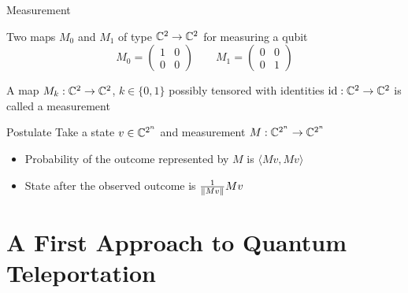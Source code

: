 \documentclass{beamer}
\begin{document}
\begin{frame}{Measurement}

        Two maps $M_0$ and $M_1$ of type $\mathbb{C}^2 \to \mathbb{C}^2$ for
        measuring a qubit
        \[
                M_0 = \begin{pmatrix}
                        1 & 0 \\
                        0 & 0 
                \end{pmatrix}
                \qquad
                M_1 = \begin{pmatrix}
                        0 & 0 \\
                        0 & 1
                \end{pmatrix}
        \]

        A map $M_k : \mathbb{C}^{2} \to \mathbb{C}^{2}$, $k \in \{0,1\}$ possibly
        tensored with identities $\mathrm{id} : \mathbb{C}^2 \to \mathbb{C}^2$ is called a
        \alert{measurement}


        \vfill
        \begin{block}{Postulate}
           Take a state $v \in \mathbb{C}^{2^n}$ and measurement $M :
           \mathbb{C}^{2^n} \to \mathbb{C}^{2^n}$
           \begin{itemize}
                \item Probability of the outcome represented by $M$ is $\langle
                        M v, M v \rangle$
                \item State after the observed outcome is $\frac{1}{\left\lVert M
                        v\right\rVert}M v$

           \end{itemize}         
        \end{block}
\end{frame}

\section{A First Approach to Quantum Teleportation}
\end{document}
